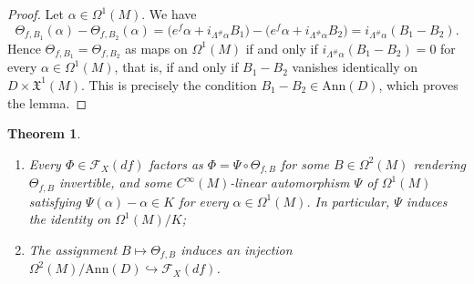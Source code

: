 \documentclass[11pt,a4paper]{article}
\theoremstyle{plain}
\newtheorem{theorem}{Theorem}[section]
\theoremstyle{definition}
\theoremstyle{remark}
\begin{document}
\begin{proof}
	Let $\alpha \in \Omega^1(M)$. We have
	$$
	\Theta_{f,B_1}(\alpha) - \Theta_{f,B_2}(\alpha)
	= \bigl(e^f \alpha + i_{\Lambda^{\#}\alpha} B_1\bigr) - \bigl(e^f \alpha + i_{\Lambda^{\#}\alpha} B_2\bigr)
	= i_{\Lambda^{\#}\alpha}(B_1 - B_2).
	$$
	Hence $\Theta_{f,B_1} = \Theta_{f,B_2}$ as maps on $\Omega^1(M)$ if and only if
	$i_{\Lambda^{\#}\alpha}(B_1 - B_2) = 0$ for every $\alpha \in \Omega^1(M)$, that is, if and only if $B_1 - B_2$
	vanishes identically on $D \times \mathfrak{X}^1(M)$. This is precisely
	the condition $B_1 - B_2 \in \mathrm{Ann}(D)$, which proves the lemma.
\end{proof}

\begin{theorem}\label{thm:structure-fibre}\mbox{ }\vspace*{-.2cm}
	\begin{enumerate}[label=(\roman*)]
		\item Every $\Phi \in \mathcal{F}_X(df)$ factors as $\Phi = \Psi \circ \Theta_{f,B}$ for some $B \in \Omega^2(M)$
		rendering $\Theta_{f,B}$ invertible, and some $C^{\infty}(M)$-linear automorphism $\Psi$ of $\Omega^1(M)$
		satisfying $\Psi(\alpha) - \alpha \in K$ for every $\alpha \in \Omega^1(M)$. In particular, $\Psi$ induces the
		identity on $\Omega^1(M)/K$;
		\item The assignment $B \mapsto \Theta_{f,B}$ induces an injection $\Omega^2(M)/\mathrm{Ann}(D) \hookrightarrow \mathcal{F}_X(df)$.
	\end{enumerate}
\end{theorem}
\end{document}
